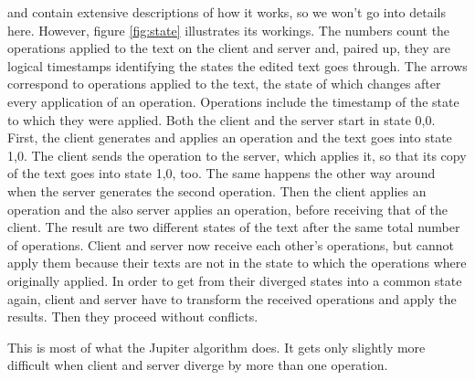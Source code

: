 \documentclass[a4paper,final,12pt,oneside,article,table]{memoir}
\newcommand{\lining}{\setmainfont[Ligatures=TeX,Numbers=Lining]{Arno Pro}} %
\newcommand*{\state}[1]{{\lining#1}\xspace}
\begin{document}
\cite{Jupiter} and \cite{UnderstandOT} contain extensive descriptions of
how it works, so we won't go into details here. However, figure
\ref{fig:state} illustrates its workings. The numbers count the
operations applied to the text on the client and server and, paired up,
they are logical timestamps identifying the states the edited text goes
through. The arrows correspond to operations applied to the text, the
state of which changes after every application of an operation.
Operations include the timestamp of the state to which they were
applied. Both the client and the server start in state \state{0,0}.
First, the client generates and applies an operation and the text goes
into state \state{1,0}. The client sends the operation to the server,
which applies it, so that its copy of the text goes into state
\state{1,0}, too. The same happens the other way around when the server
generates the second operation. Then the client applies an operation and
the also server applies an operation, before receiving that of the
client. The result are two different states of the text after the same
total number of operations. Client and server now receive each other's
operations, but cannot apply them because their texts are not in the
state to which the operations where originally applied. In order to get
from their diverged states into a common state again, client and server
have to transform the received operations and apply the results. Then
they proceed without conflicts.

This is most of what the Jupiter algorithm does. It gets only slightly
more difficult when client and server diverge by more than one
operation.
\end{document}
